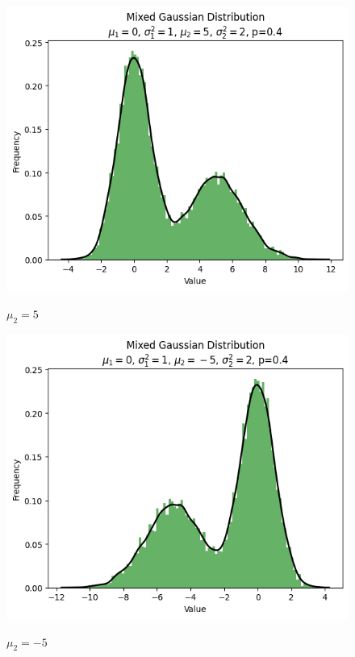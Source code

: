 \documentclass{article}
\begin{document}
\begin{figure}[H]
    \centering
    \begin{minipage}[b]{0.4\linewidth}  %
        \centering
        \includegraphics[width=\linewidth]{figure/混合高斯分布.png}  %
        \caption{\label{图:mu_2=5}}$\mu_2=5$
    \end{minipage}
    \hfill  %
    \begin{minipage}[b]{0.4\linewidth}  %
        \centering
        \includegraphics[width=\linewidth]{figure/mu_2=-5.png}  %
        \caption{\label{图:mu_2=-5}}$\mu_2=-5$
    \end{minipage}
\end{figure}
\end{document}
